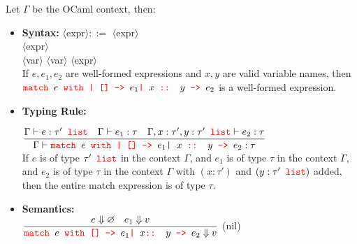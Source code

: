 


\newpage

\begin{Def}

    Let $\Gamma$ be the OCaml context, then:
    \begin{itemize}
        \item \textbf{Syntax:} \LARGE 
        $\langle$expr$\rangle::=$ $\langle$expr$\rangle$\\
        \text{}\hspace{7.5em}\texttr{| [] -> }$\langle$expr$\rangle$\\
        \text{}\hspace{7.5em}\texttr{| }$\langle$var$\rangle$ \texttr{:: }$\langle$var$\rangle$ \texttr{-> }$\langle$expr$\rangle$ \normalsize\\

        \vspace{-1em}
        \noindent
        If $e, e_1, e_2$ are well-formed expressions and $x, y$ are valid variable names, then\\
        $\texttt{\color{red}{match }} e \texttt{\color{red}{ with | [] -> }} e_1 \texttt{\color{red}{| }} x \texttt{\color{red}{ :: }} y \texttt{\color{red}{ -> }} e_2$
        is a well-formed expression.

        \item \textbf{Typing Rule:}\\ \LARGE 
        
        $\dfrac{\Gamma\vdash e:\tau' \texttt{\color{red}{ list}} \quad \Gamma\vdash e_1:\tau \quad \Gamma, x:\tau', y:\tau' \texttt{\color{red}{ list}} \vdash e_2:\tau}
        {\Gamma\vdash \texttt{\color{red}{match }} e \texttt{\color{red}{ with | [] -> }} e_1 \texttt{\color{red}{| }} x \texttt{\color{red}{ :: }} y \texttt{\color{red}{ -> }} e_2 : \tau}$ \normalsize\\
        
        \noindent
        If $e$ is of type $\tau' \texttt{\color{red}{ list}}$ in the context $\Gamma$, and $e_1$ is of type $\tau$ in the context $\Gamma$, and $e_2$ is of type $\tau$ in the context $\Gamma$ with $(x:\tau')$ and $(y:\tau' \texttt{\color{red}{ list}})$ added, then the entire match expression is of type $\tau$.

        \item \textbf{Semantics:}\\ 
        \LARGE 
            $\dfrac{e \Downarrow \varnothing \quad e_1 \Downarrow v}{\texttt{\color{red}{match }} e \texttt{\color{red}{ with}} \texttt{\color{red}{ [] -> }} e_1 \texttt{\color{red}{| }} x \texttt{\color{red}{:: }} y \texttt{\color{red}{ -> }} e_2 \Downarrow v}$ (nil) \normalsize\\
            

\end{itemize}
\end{Def}
